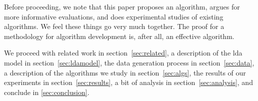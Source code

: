 
Before proceeding, we note that this paper proposes an algorithm,
argues for more informative evaluations, and does experimental studies
of existing algorithms.  We feel these things go very much together.  The
proof for a methodology for algorithm development is, after all, an
effective algorithm.

We proceed with related work in section~\ref{sec:related}, a
description of the lda model in section~\ref{sec:ldamodel}, the data
generation process in section~\ref{sec:data}, a description of the
algorithms we study in section~\ref{sec:algs}, the results of our
experiments in section~\ref{sec:results}, a bit of analysis in
section~\ref{sec:analysis}, and conclude in \ref{sec:conclusion}.


